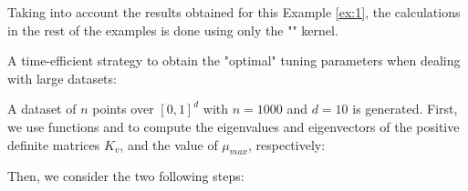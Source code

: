 Taking into account the results obtained for this Example \ref{ex:1}, the calculations in the rest of the examples is done using only the "" kernel.
\begin{exemp}\label{ex:3} A time-efficient strategy to obtain the "optimal" tuning parameters when dealing with large datasets:
\end{exemp}
A dataset of $n$ points  over $[0,1]^d$ with $n=1000$ and $d=10$ is generated. First, we use functions  and  to compute the eigenvalues and eigenvectors of the positive definite matrices $K_v$, and the value of $\mu_{max}$, respectively:
Then, we consider the two following steps:
